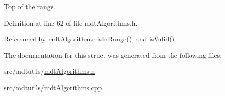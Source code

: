 Top of the range. 



Definition at line 62 of file mdt\-Algorithms.\-h.



Referenced by mdt\-Algorithms\-::is\-In\-Range(), and is\-Valid().



The documentation for this struct was generated from the following files\-:\begin{DoxyCompactItemize}
\item 
src/mdtutils/\hyperlink{mdt_algorithms_8h}{mdt\-Algorithms.\-h}\item 
src/mdtutils/\hyperlink{mdt_algorithms_8cpp}{mdt\-Algorithms.\-cpp}\end{DoxyCompactItemize}
